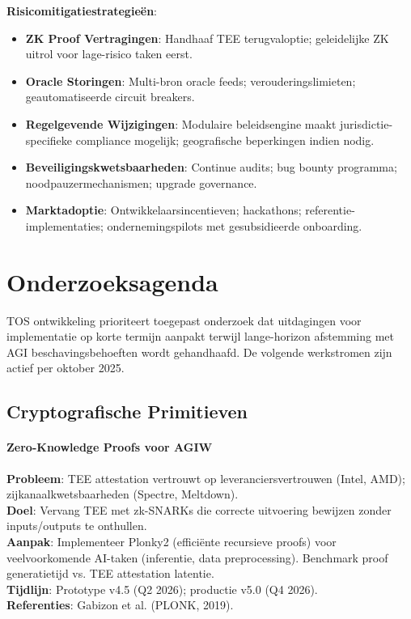 \documentclass[11pt]{article}
\begin{document}
\textbf{Risicomitigatiestrategieën}:
\begin{itemize}[noitemsep]
  \item \textbf{ZK Proof Vertragingen}: Handhaaf TEE terugvaloptie; geleidelijke ZK uitrol voor lage-risico taken eerst.
  \item \textbf{Oracle Storingen}: Multi-bron oracle feeds; verouderingslimieten; geautomatiseerde circuit breakers.
  \item \textbf{Regelgevende Wijzigingen}: Modulaire beleidsengine maakt jurisdictie-specifieke compliance mogelijk; geografische beperkingen indien nodig.
  \item \textbf{Beveiligingskwetsbaarheden}: Continue audits; bug bounty programma; noodpauzermechanismen; upgrade governance.
  \item \textbf{Marktadoptie}: Ontwikkelaarsincentieven; hackathons; referentie-implementaties; ondernemingspilots met gesubsidieerde onboarding.
\end{itemize}

\section{Onderzoeksagenda}
\label{sec:research}

TOS ontwikkeling prioriteert toegepast onderzoek dat uitdagingen voor implementatie op korte termijn aanpakt terwijl lange-horizon afstemming met AGI beschavingsbehoeften wordt gehandhaafd. De volgende werkstromen zijn actief per oktober 2025.

\subsection{Cryptografische Primitieven}

\paragraph{Zero-Knowledge Proofs voor AGIW}
\textbf{Probleem}: TEE attestation vertrouwt op leveranciersvertrouwen (Intel, AMD); zijkanaalkwetsbaarheden (Spectre, Meltdown).\\
\textbf{Doel}: Vervang TEE met zk-SNARKs die correcte uitvoering bewijzen zonder inputs/outputs te onthullen.\\
\textbf{Aanpak}: Implementeer Plonky2 (efficiënte recursieve proofs) voor veelvoorkomende AI-taken (inferentie, data preprocessing). Benchmark proof generatietijd vs. TEE attestation latentie.\\
\textbf{Tijdlijn}: Prototype v4.5 (Q2 2026); productie v5.0 (Q4 2026).\\
\textbf{Referenties}: Gabizon et al. (PLONK, 2019).
\end{document}
